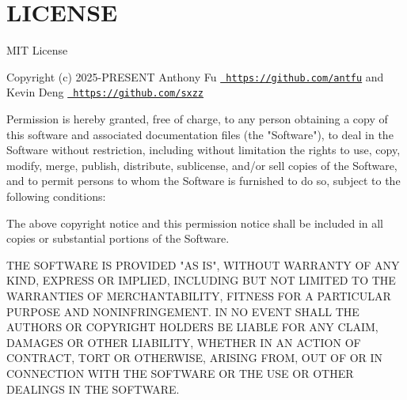 \chapter{LICENSE}
\hypertarget{md_node__modules_2quansync_2_l_i_c_e_n_s_e}{}\label{md_node__modules_2quansync_2_l_i_c_e_n_s_e}
MIT License

Copyright (c) 2025-\/PRESENT Anthony Fu \href{https://github.com/antfu}{\texttt{ https\+://github.\+com/antfu}} and Kevin Deng \href{https://github.com/sxzz}{\texttt{ https\+://github.\+com/sxzz}}

Permission is hereby granted, free of charge, to any person obtaining a copy of this software and associated documentation files (the "{}\+Software"{}), to deal in the Software without restriction, including without limitation the rights to use, copy, modify, merge, publish, distribute, sublicense, and/or sell copies of the Software, and to permit persons to whom the Software is furnished to do so, subject to the following conditions\+:

The above copyright notice and this permission notice shall be included in all copies or substantial portions of the Software.

THE SOFTWARE IS PROVIDED "{}\+AS IS"{}, WITHOUT WARRANTY OF ANY KIND, EXPRESS OR IMPLIED, INCLUDING BUT NOT LIMITED TO THE WARRANTIES OF MERCHANTABILITY, FITNESS FOR A PARTICULAR PURPOSE AND NONINFRINGEMENT. IN NO EVENT SHALL THE AUTHORS OR COPYRIGHT HOLDERS BE LIABLE FOR ANY CLAIM, DAMAGES OR OTHER LIABILITY, WHETHER IN AN ACTION OF CONTRACT, TORT OR OTHERWISE, ARISING FROM, OUT OF OR IN CONNECTION WITH THE SOFTWARE OR THE USE OR OTHER DEALINGS IN THE SOFTWARE. 